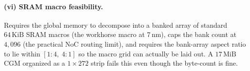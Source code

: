 \paragraph{(vi) SRAM macro feasibility.}
Requires the global memory to decompose into a banked array of standard $64\,\mathrm{KiB}$ SRAM macros (the workhorse macro at 7\,nm), caps the bank count at $4{,}096$ (the practical NoC routing limit), and requires the bank-array aspect ratio to lie within $[1{:}4,\; 4{:}1]$ so the macro grid can actually be laid out.
A $17\,\mathrm{MiB}$ CGM organized as a $1 \times 272$ strip fails this even though the byte-count is fine.




